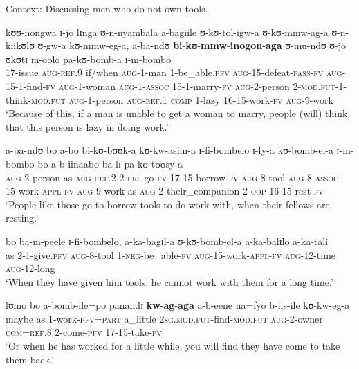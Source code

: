 \begin{exe}
\ex Context: Discussing men who do not own tools.
\label{exCommissiveSequenceConsequence}
\begin{xlist}
\ex\label{exCommissiveSequenceConsequenceSentence1}
\gll kʊʊ-nongwa ɪ-jo lɪnga ʊ-n-nyambala a-bagiile ʊ-kʊ-tol-igw-a ʊ-kʊ-mmw-ag-a ʊ-n-kiikʊlʊ ʊ-gw-a kʊ-mmw-eg-a, a-ba-ndʊ \textbf{bi}-\textbf{kʊ}-\textbf{mmw}-\textbf{inogon}-\textbf{aga} ʊ-mu-ndʊ ʊ-jo ʊkʊtɪ m-oolo pa-kʊ-bomb-a ɪ-m-bombo\\
17-issue \textsc{aug}-\textsc{ref.9} if/when \textsc{aug}-1-man 1-be\_able.\textsc{pfv} \textsc{aug}-15-defeat-\textsc{pass}-\textsc{fv} \textsc{aug}-15-1-find-\textsc{fv} \textsc{aug}-1-woman \textsc{aug}-1-\textsc{assoc} 15-1-marry-\textsc{fv} \textsc{aug}-2-person 2-\textsc{mod.fut}-1-think-\textsc{mod.fut} \textsc{aug}-1-person \textsc{aug}-\textsc{ref.1} \textsc{comp} 1-lazy 16-15-work-\textsc{fv} \textsc{aug}-9-work\\
\glt \lq Because of this, if a man is unable to get a woman to marry, people (will) think that this person is lazy in doing work.' %

\ex \label{exCommissiveSequenceConsequenceSentence2}
\gll a-ba-ndʊ bo a-bo bi-kʊ-bʊʊk-a kʊ-kw-asim-a ɪ-fi-bombelo ɪ-fy-a kʊ-bomb-el-a ɪ-m-bombo bo a-b-iinaabo ba-lɪ pa-kʊ-tʊʊsy-a\\
\textsc{aug}-2-person as \textsc{aug}-\textsc{ref.2} 2-\textsc{prs}-go-\textsc{fv} 17-15-borrow-\textsc{fv} \textsc{aug}-8-tool \textsc{aug}-8-\textsc{assoc} 15-work-\textsc{appl}-\textsc{fv} \textsc{aug}-9-work as \textsc{aug}-2-their\_companion 2-\textsc{cop} 16-15-rest-\textsc{fv}\\
\glt \lq People like those go to borrow tools to do work with, when their fellows are resting.'

\ex \label{exCommissiveSequenceConsequenceSentence3}
 \gll  bo ba-m-peele ɪ-fi-bombelo, a-ka-bagɪl-a ʊ-kʊ-bomb-el-a a-ka-balɪlo a-ka-tali\\
as 2-1-give.\textsc{pfv} \textsc{aug}-8-tool 1-\textsc{neg}-be\_able-\textsc{fv} \textsc{aug}-15-work-\textsc{appl}-\textsc{fv} \textsc{aug}-12-time \textsc{aug}-12-long\\
\glt \lq When they have given him tools, he cannot work with them for a long time.'

\ex \label{exCommissiveSequenceConsequenceSentence4}
 \gll lʊmo bo a-bomb-ile=po panandɪ \textbf{kw}-\textbf{ag}-\textbf{aga} a-b-eene na=fyo b-iis-ile kʊ-kw-eg-a\\
maybe as 1-work-\textsc{pfv}=\textsc{part} a\_little \textsc{2sg.mod.fut}-find-\textsc{mod.fut} \textsc{aug}-2-owner \textsc{com}=\textsc{ref.8} 2-come-\textsc{pfv} 17-15-take-\textsc{fv}\\
\glt \lq Or when he has worked for a little while, you will find they have come to take them back.'


\end{xlist}
\end{exe}
